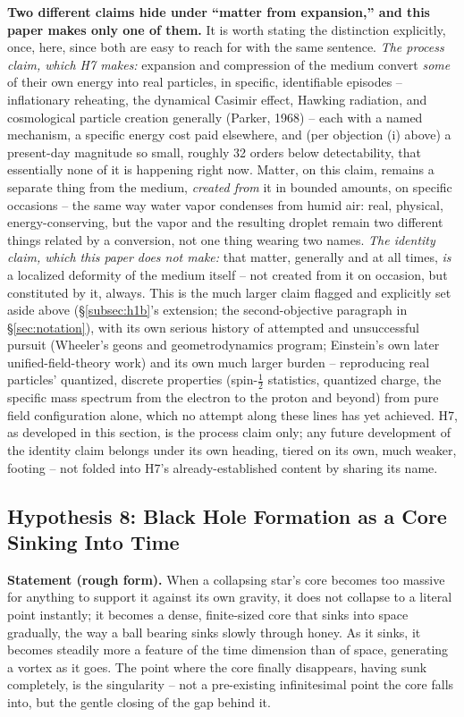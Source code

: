 \documentclass[12pt, a4paper]{article}
\begin{document}
\textbf{Two different claims hide under ``matter from expansion,''
and this paper makes only one of them.} It is worth stating the
distinction explicitly, once, here, since both are easy to reach for
with the same sentence. \emph{The process claim, which H7 makes:}
expansion and compression of the medium convert \emph{some} of their
own energy into real particles, in specific, identifiable episodes --
inflationary reheating, the dynamical Casimir effect, Hawking
radiation, and cosmological particle creation generally (Parker,
1968) -- each with a named mechanism, a specific energy cost paid
elsewhere, and (per objection (i) above) a present-day magnitude so
small, roughly 32 orders below detectability, that essentially none
of it is happening right now. Matter, on this claim, remains a
separate thing from the medium, \emph{created from} it in bounded
amounts, on specific occasions -- the same way water vapor condenses
from humid air: real, physical, energy-conserving, but the vapor and
the resulting droplet remain two different things related by a
conversion, not one thing wearing two names. \emph{The identity
claim, which this paper does not make:} that matter, generally and at
all times, \emph{is} a localized deformity of the medium itself --
not created from it on occasion, but constituted by it, always. This
is the much larger claim flagged and explicitly set aside above
(\S\ref{subsec:h1b}'s extension; the second-objective paragraph in
\S\ref{sec:notation}), with its own serious history of attempted and
unsuccessful pursuit (Wheeler's geons and geometrodynamics program;
Einstein's own later unified-field-theory work) and its own much
larger burden -- reproducing real particles' quantized, discrete
properties (spin-$\tfrac12$ statistics, quantized charge, the
specific mass spectrum from the electron to the proton and beyond)
from pure field configuration alone, which no attempt along these
lines has yet achieved. H7, as developed in this section, is the
process claim only; any future development of the identity claim
belongs under its own heading, tiered on its own, much weaker,
footing -- not folded into H7's already-established content by
sharing its name.

\subsection{Hypothesis 8: Black Hole Formation as a Core Sinking Into Time}
\label{subsec:h8}
\textbf{Statement (rough form).} When a collapsing star's core becomes
too massive for anything to support it against its own gravity, it
does not collapse to a literal point instantly; it becomes a dense,
finite-sized core that sinks into space gradually, the way a ball
bearing sinks slowly through honey. As it sinks, it becomes steadily
more a feature of the time dimension than of space, generating a
vortex as it goes. The point where the core finally disappears,
having sunk completely, is the singularity -- not a pre-existing
infinitesimal point the core falls into, but the gentle closing of
the gap behind it.
\end{document}
